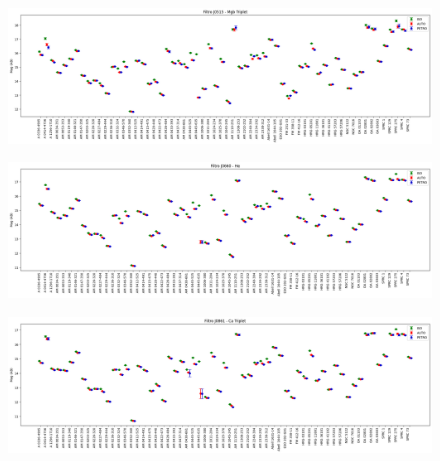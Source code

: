 \begin{anexosenv}
    \begin{figure}[h]
        \centering
        \includegraphics[width=1.0\textwidth]{Imagens/galaxias_horizontal_J0515.png}
        \caption[]{}
        \label{fig:galaxias_horizontal_J0515} 
    \end{figure}

    \begin{figure}[h]
        \centering
        \includegraphics[width=1.0\textwidth]{Imagens/galaxias_abertura_J0660.png}
        \caption[]{}
        \label{fig:galaxias_abertura_J0660} 
    \end{figure}

    \begin{figure}[h]
        \centering
        \includegraphics[width=1.0\textwidth]{Imagens/galaxias_horizontal_J0861.png}
        \caption[]{}
        \label{fig:galaxias_horizontal_J0861} 
    \end{figure}


\end{anexosenv}
